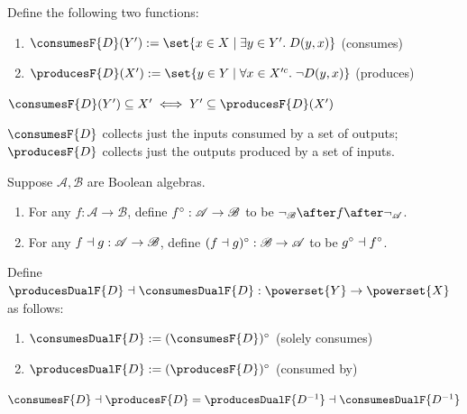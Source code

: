 \begin{definition}
   Define the following two functions:
   \begin{enumerate}
      \item $\consumesF{D}(Y') \eqdef \set{x \in X \mid \exists y \in Y'.\;D(y,x)}$ \hfill (consumes)
      \item $\producesF{D}(X') \eqdef \set{y \in Y \mid \forall x \in \compl{X'}.\;\neg D(y,x)}$ \hfill (produces)
   \end{enumerate}
\end{definition}

\begin{lemma}
   $\consumesF{D}(Y') \subseteq X' \iff Y' \subseteq \producesF{D}(X')$
\end{lemma}

\noindent $\consumesF{D}$ collects just the inputs consumed by a set of outputs; $\producesF{D}$ collects just the outputs produced by a set of inputs.

\begin{definition}
   Suppose $\mathcal{A}, \mathcal{B}$ are Boolean algebras.
   \begin{enumerate}
      \item For any $f: \mathcal{A} \to \mathcal{B}$, define $f^{\circ}: \mathcal{A} \to \mathcal{B}$ to be $\neg_{\mathcal{B}} \after f \after \neg_{\mathcal{A}}$.
      \item For any $f \dashv g: \mathcal{A} \to \mathcal{B}$, define $(f \dashv g)^{\circ}: \mathcal{B} \to \mathcal{A}$ to be $g^{\circ} \dashv f^{\circ}$.
   \end{enumerate}
\end{definition}

\begin{definition} Define $\producesDualF{D} \adjoint \consumesDualF{D}: \powerset{Y} \to \powerset{X}$ as follows:
   \begin{enumerate}
      \item $\consumesDualF{D} \eqdef \dual{(\consumesF{D})}$ \hfill (solely consumes)
      \item $\producesDualF{D} \eqdef \dual{(\producesF{D})}$ \hfill (consumed by)
   \end{enumerate}
\end{definition}

\begin{lemma}
   $\consumesF{D} \adjoint \producesF{D} = \producesDualF{D^{-1}} \adjoint \consumesDualF{D^{-1}}$
\end{lemma}

